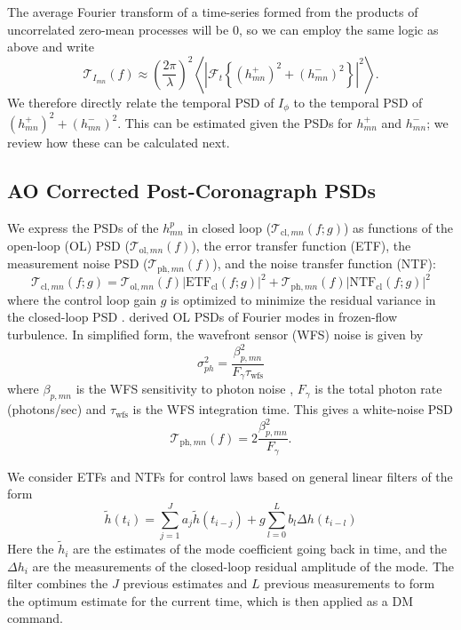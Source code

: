 \documentclass[10pt,preprint]{aastex631}
\begin{document}
The average Fourier transform of a time-series formed from the products of uncorrelated zero-mean processes will be 0, so we can employ the same logic as above and write
\begin{equation}
\mathcal{T}_{I_{mn}}(f) \approx \left(\frac{2\pi}{\lambda}\right)^2  \left\langle \left| \mathcal{F}_t\left\{   (h_{mn}^{+})^2 + (h_{mn}^{-})^2  \right\} \right|^2 \right\rangle  .
\label{eqn:psd_h2}
\end{equation}
We therefore directly relate the temporal PSD of $I_\phi$ to the temporal PSD of $(h_{mn}^{+})^2 + (h_{mn}^{-})^2$. This can be estimated given the PSDs for $h_{mn}^{+}$ and $h_{mn}^{-}$; we review how these can be calculated next.

\subsection{AO Corrected Post-Coronagraph PSDs}

We express the PSDs of the $h_{mn}^p$ in closed loop ($\mathcal{T}_{\mathrm{cl},mn}(f;g)$) as functions of the open-loop (OL) PSD ($\mathcal{T}_{\mathrm{ol},mn}(f)$), the error transfer function (ETF), the measurement noise PSD ($\mathcal{T}_{\mathrm{ph},mn}(f)$), and the noise transfer function (NTF): 
\begin{equation}
\mathcal{T}_{\mathrm{cl},mn}(f;g) = \mathcal{T}_{\mathrm{ol},mn}(f) \left| \mbox{ETF}_{\mathrm{cl}}(f;g) \right|^2 + \mathcal{T}_{\mathrm{ph},mn}(f) \left| \mbox{NTF}_{\mathrm{cl}}(f;g) \right|^2 
\label{eqn:cl_psd}
\end{equation}
where the control loop gain $g$ is optimized to minimize the residual variance in the closed-loop PSD \citep{1999aoa..book.....R_ch6,2016ApOpt..55..323P}. \citet{2018JATIS...4a9001M} derived OL PSDs of Fourier modes in frozen-flow turbulence.  In simplified form, the wavefront sensor (WFS) noise is given by
\begin{equation}
\sigma_{ph}^2 = \frac{\beta_{p,mn}^2}{F_\gamma \tau_\mathrm{wfs}}
\label{eqn:photon_noise}
\end{equation}
where $\beta_{p,mn}$ is the WFS sensitivity to photon noise \citep{2005ApJ...629..592G}, $F_\gamma$ is the total photon rate (photons/sec) and $\tau_\mathrm{wfs}$ is the WFS integration time.  This gives a white-noise PSD
\begin{equation}
\mathcal{T}_{\mathrm{ph},mn}(f) = 2\frac{\beta_{p,mn}^2}{F_\gamma }.
\end{equation}


We consider ETFs and NTFs for control laws based on general linear filters of the form
\begin{equation}
\widetilde{h} (t_i) = \sum_{j=1}^J a_j \widetilde{h}(t_{i-j}) + g\sum_{l=0}^L b_l \Delta h (t_{i-l})  
\label{eqn:linfilt}
\end{equation}
Here the $\widetilde{h}_i$ are the estimates of the mode coefficient going back in time, and the $\Delta h_i$ are the measurements of the closed-loop residual amplitude of the mode.  The filter combines the $J$ previous estimates and $L$ previous measurements to form the optimum estimate for the current time, which is then applied as a DM command.  
\end{document}
